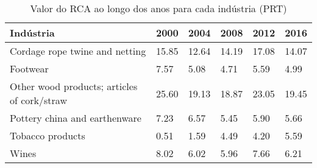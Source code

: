 \begin{table}
\centering
\caption{Valor do RCA ao longo dos anos para cada indústria (PRT)}
\label{tab:ex3-tempo-PRT}
\begin{tabular}{p{6cm}p{1.5cm}p{1.5cm}p{1.5cm}p{1.5cm}p{1.5cm}}
\toprule
                                  Indústria &  2000 &  2004 &  2008 &  2012 &  2016 \\
\midrule
             Cordage rope twine and netting & 15.85 & 12.64 & 14.19 & 17.08 & 14.07 \\
                                   Footwear &  7.57 &  5.08 &  4.71 &  5.59 &  4.99 \\
Other wood products; articles of cork/straw & 25.60 & 19.13 & 18.87 & 23.05 & 19.45 \\
              Pottery china and earthenware &  7.23 &  6.57 &  5.45 &  5.90 &  5.66 \\
                           Tobacco products &  0.51 &  1.59 &  4.49 &  4.20 &  5.59 \\
                                      Wines &  8.02 &  6.02 &  5.96 &  7.66 &  6.21 \\
\bottomrule
\end{tabular}
\end{table}
